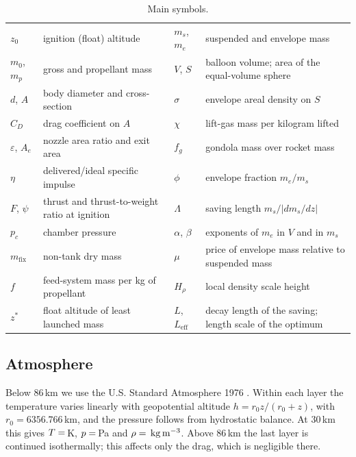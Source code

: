 \documentclass[11pt,a4paper]{article}
\makeatletter
\newcommand{\R}[1]{\csname res@#1\endcsname}
\newcommand{\kgm}{\,\mathrm{kg\,m^{-3}}}
\makeatother
\begin{document}
\begin{table}[!htb]
\centering
\caption{Main symbols.}
\label{tab:nomen}
\small
\begin{tabular}{@{}l>{\raggedright\arraybackslash}p{5.0cm}l>{\raggedright\arraybackslash}p{5.4cm}@{}}
\toprule
$z_0$ & ignition (float) altitude & $m_s$, $m_e$ & suspended and envelope mass \\
$m_0$, $m_p$ & gross and propellant mass & $V$, $S$ & balloon volume; area of the equal-volume sphere \\
$d$, $A$ & body diameter and cross-section & $\sigma$ & envelope areal density on $S$ \\
$C_D$ & drag coefficient on $A$ & $\chi$ & lift-gas mass per kilogram lifted \\
$\varepsilon$, $A_e$ & nozzle area ratio and exit area & $f_g$ & gondola mass over rocket mass \\
$\eta$ & delivered/ideal specific impulse & $\phi$ & envelope fraction $m_e/m_s$ \\
$F$, $\psi$ & thrust and thrust-to-weight ratio at ignition & $\Lambda$ & saving length $m_s/|dm_s/dz|$ \\
$p_c$ & chamber pressure & $\alpha$, $\beta$ & exponents of $m_e$ in $V$ and in $m_s$ \\
$m_{\mathrm{fix}}$ & non-tank dry mass & $\mu$ & price of envelope mass relative to suspended mass \\
$f$ & feed-system mass per kg of propellant & $H_\rho$ & local density scale height \\
$z^{*}$ & float altitude of least launched mass & $L$, $L_{\mathrm{eff}}$ & decay length of the saving; length scale of the optimum \\
\bottomrule
\end{tabular}
\end{table}

\subsection{Atmosphere}

Below 86\,km we use the U.S. Standard Atmosphere 1976 \cite{ussa1976}. Within each layer the temperature varies linearly with geopotential altitude $h=r_0z/(r_0+z)$, with $r_0=6356.766$\,km, and the pressure follows from hydrostatic balance. At 30\,km this gives $T=\R{atmT}$\,K, $p=\R{atmP}$\,Pa and $\rho=\R{atmRho}\kgm$. Above 86\,km the last layer is continued isothermally; this affects only the drag, which is negligible there.
\end{document}
